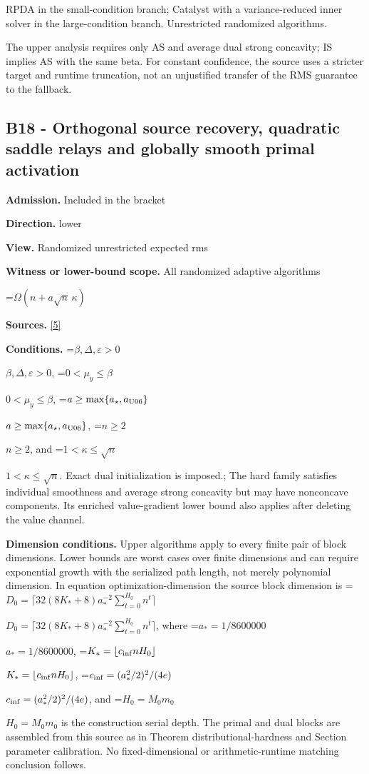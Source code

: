 \documentclass[10pt,a4paper]{article}
\newcommand{\AtlasMath}[1]{\par\begingroup\centering\setbox0=\hbox{$\displaystyle #1$}\ifdim\wd0>1.4\linewidth\typeout{ATLAS WIDE FORMULA: \the\wd0}\fi\ifdim\wd0>\linewidth\resizebox{\linewidth}{!}{\box0}\else\box0\fi\par\endgroup}
\newcommand{\AtlasInlineMath}[1]{\begingroup\setbox0=\hbox{$#1$}\ifdim\wd0>.4\linewidth\endgroup\AtlasMath{#1}\else\endgroup$#1$\fi}
\begin{document}
RPDA in the small-condition branch; Catalyst with a variance-reduced inner solver in the large-condition branch. Unrestricted randomized algorithms.



The upper analysis requires only AS and average dual strong concavity; IS implies AS with the same beta. For constant confidence, the source uses a stricter target and runtime truncation, not an unjustified transfer of the RMS guarantee to the fallback.



\subsection{B18 - Orthogonal source recovery, quadratic saddle relays and globally smooth primal activation}


\textbf{Admission.} Included in the bracket



\textbf{Direction.} lower



\textbf{View.} Randomized unrestricted expected rms



\textbf{Witness or lower-bound scope.} All randomized adaptive algorithms



\AtlasMath{\Omega(n+a\sqrt n\,\kappa)}


\textbf{Sources.} \href{https://github.com/WU-Wendao/Colombo/blob/main/colombo_sensorium/Complexity_altas/data/sources/colombo/U06/manuscript.pdf}{[5]}



\textbf{Conditions.} \AtlasInlineMath{\beta,\Delta,\varepsilon>0}, \AtlasInlineMath{0<\mu_y\le\beta}, \AtlasInlineMath{a\ge\max\{a_\star,a_{\rm U06}\}}, \AtlasInlineMath{n\ge2}, and \AtlasInlineMath{1<\kappa\le\sqrt n}. Exact dual initialization is imposed.; The hard family satisfies individual smoothness and average strong concavity but may have nonconcave components. Its enriched value-gradient lower bound also applies after deleting the value channel.



\textbf{Dimension conditions.} Upper algorithms apply to every finite pair of block dimensions. Lower bounds are worst cases over finite dimensions and can require exponential growth with the serialized path length, not merely polynomial dimension. In equation optimization-dimension the source block dimension is \AtlasInlineMath{D_0=\lceil32(8K_*+8)a_*^{-2}\sum_{t=0}^{H_0}n^t\rceil}, where \AtlasInlineMath{a_*=1/8600000}, \AtlasInlineMath{K_*=\lfloor c_{\rm inf}nH_0\rfloor}, \AtlasInlineMath{c_{\rm inf}=(a_*^2/2)^2/(4e)}, and \AtlasInlineMath{H_0=M_0m_0} is the construction serial depth. The primal and dual blocks are assembled from this source as in Theorem distributional-hardness and Section parameter calibration. No fixed-dimensional or arithmetic-runtime matching conclusion follows.
\end{document}
